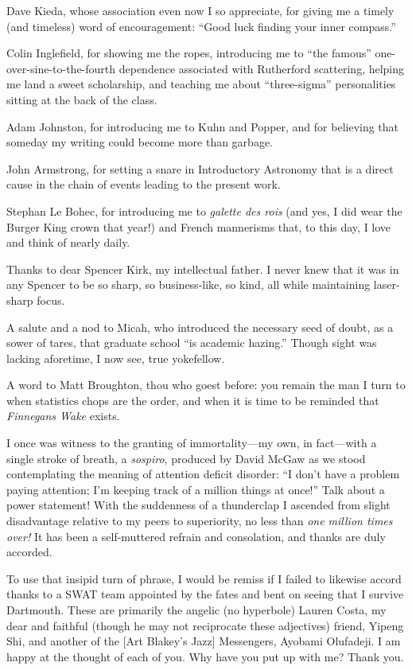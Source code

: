 Dave Kieda, whose association even now I so appreciate, for giving me a timely
(and timeless) word of encouragement: ``Good luck finding your inner compass.''

Colin Inglefield, for showing me the ropes, introducing me to ``the famous''
one-over-sine-to-the-fourth dependence associated with Rutherford scattering,
helping me land a sweet scholarship, and teaching me about ``three-sigma''
personalities sitting at the back of the class. 

Adam Johnston, for introducing me to Kuhn and Popper, and for believing that
someday my writing could become more than garbage. 

John Armstrong, for setting a snare in Introductory Astronomy that is a direct
cause in the chain of events leading to the present work.

Stephan Le Bohec, for introducing me to \emph{galette des rois} (and yes, I did
wear the Burger King crown that year!) and French mannerisms that, to this day,
I love and think of nearly daily.

Thanks to dear Spencer Kirk, my intellectual father. I never knew that it was in
any Spencer to be so sharp, so business-like, so kind, all while maintaining
laser-sharp focus.

A salute and a nod to Micah, who introduced the necessary seed of doubt, as a
sower of tares, that graduate school ``is academic hazing.''  Though sight was
lacking aforetime, I now see, true yokefellow.

A word to Matt Broughton, thou who goest before: you remain the man I turn to
when statistics chops are the order, and when it is time to be reminded that
\textit{Finnegans Wake} exists.

I once was witness to the granting of immortality---my own, in fact---with a
single stroke of breath, a \textsl{sospiro}, produced by David McGaw as we stood
contemplating the meaning of attention deficit disorder: ``I don't have a
problem paying attention; I'm keeping track of a million things at once!''  Talk
about a power statement! With the suddenness of a thunderclap I ascended from
slight disadvantage relative to my peers to superiority, no less than \emph{one
  million times over!}  It has been a self-muttered refrain and consolation, and
thanks are duly accorded.

To use that insipid turn of phrase, I would be remiss if I failed to likewise
accord thanks to a SWAT team appointed by the fates and bent on seeing that I
survive Dartmouth. These are primarily the angelic (no hyperbole) Lauren Costa,
my dear and faithful (though he may not reciprocate these adjectives) friend,
Yipeng Shi, and another of the [Art Blakey's Jazz] Messengers, Ayobami
Olufadeji. I am happy at the thought of each of you. Why have you put up with
me? Thank you.

